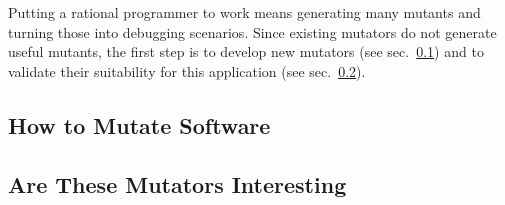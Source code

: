 
Putting a rational programmer to work means generating many mutants and turning
those into debugging scenarios. Since existing mutators do not generate useful
mutants, the first step is to develop new mutators (see sec.~\ref{sub:mutate-mutators})
and to validate their suitability for this application (see sec.~\ref{sub:mutate-interesting}).


\def\sub#1#2{\subsection{#2} \label{sub:mutate-#1} }


\sub{mutators}   {How to Mutate Software} 
\sub{interesting}{Are These Mutators Interesting} 
